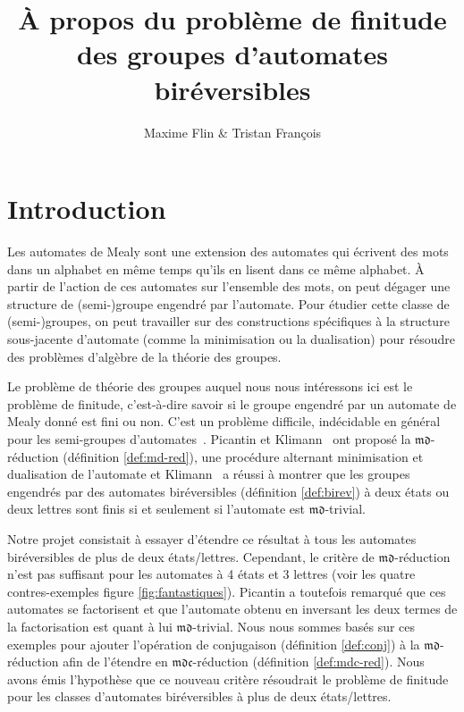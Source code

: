 \documentclass[11pt,a4paper]{article}
\title{À propos du problème de finitude des groupes d'automates biréversibles}
\author{Maxime Flin \& Tristan François}
\begin{document}
\maketitle

\section*{Introduction}
Les automates de Mealy sont une extension des automates qui écrivent des mots dans un alphabet en même temps qu'ils en lisent dans ce même alphabet. À partir de l'action de ces automates sur l'ensemble des mots, on peut dégager une structure de (semi-)groupe engendré par l'automate. Pour étudier cette classe de (semi-)groupes, on peut travailler sur des constructions spécifiques à la structure sous-jacente d'automate (comme la minimisation ou la dualisation) pour résoudre des problèmes d'algèbre de la théorie des groupes.

Le problème de théorie des groupes auquel nous nous intéressons ici est le problème de finitude, c’est-à-dire savoir si le groupe engendré par un automate de Mealy donné est fini ou non. C'est un problème difficile, indécidable en général pour les semi-groupes d'automates~\cite{Undecidable}. Picantin et Klimann~\cite{DBLP:journals/corr/abs-1105-4725} ont proposé la $\mathfrak{md}$-réduction (définition \ref{def:md-red}), une procédure alternant minimisation et dualisation de l'automate et Klimann~\cite{Klimann13} a réussi à montrer que les groupes engendrés par des automates biréversibles (définition \ref{def:birev}) à deux états ou deux lettres sont finis si et seulement si l'automate est $\mathfrak{md}$-trivial.

Notre projet consistait à essayer d'étendre ce résultat à tous les automates biréversibles de plus de deux états/lettres. Cependant,  le critère de $\mathfrak{md}$-réduction n'est pas suffisant pour les automates à 4 états et 3 lettres (voir les quatre contres-exemples figure \ref{fig:fantastiques}). Picantin a toutefois remarqué que ces automates se factorisent et que l'automate obtenu en inversant les deux termes de la factorisation est quant à lui $\mathfrak{md}$-trivial. Nous nous sommes basés sur ces exemples pour ajouter l'opération de conjugaison (définition \ref{def:conj}) à la $\mathfrak{md}$-réduction afin de l'étendre en $\mathfrak{mdc}$-réduction (définition \ref{def:mdc-red}). Nous avons émis l'hypothèse que ce nouveau critère résoudrait le problème de finitude pour les classes d'automates biréversibles à plus de deux états/lettres.
\end{document}

